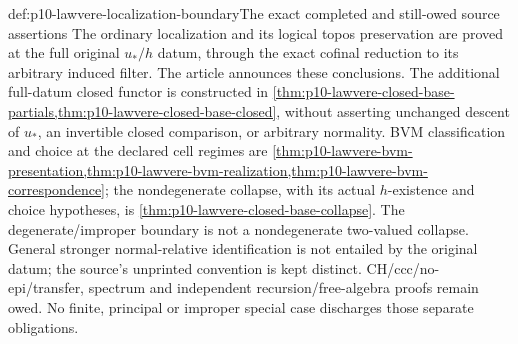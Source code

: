 \begin{proofboundary}{def:p10-lawvere-localization-boundary}{The exact completed and still-owed source assertions}
The ordinary localization and its logical topos preservation are
proved at the full original \(u_* / h\) datum, through the exact
cofinal reduction to its arbitrary induced filter. The article
announces these conclusions. The additional full-datum closed
functor is constructed in
\cref{thm:p10-lawvere-closed-base-partials,thm:p10-lawvere-closed-base-closed},
without asserting unchanged descent of \(u_*\), an invertible
closed comparison, or arbitrary normality. BVM classification and
choice at the declared cell regimes are
\cref{thm:p10-lawvere-bvm-presentation,thm:p10-lawvere-bvm-realization,thm:p10-lawvere-bvm-correspondence};
the nondegenerate collapse, with its actual \(h\)-existence and
choice hypotheses, is \cref{thm:p10-lawvere-closed-base-collapse}.
The degenerate/improper boundary is not a nondegenerate two-valued
collapse. General stronger normal-relative identification is not
entailed by the original datum; the source's unprinted convention
is kept distinct. CH/ccc/no-epi/transfer, spectrum and independent
recursion/free-algebra proofs remain owed. No finite, principal
or improper special case discharges those separate obligations.
\end{proofboundary}
